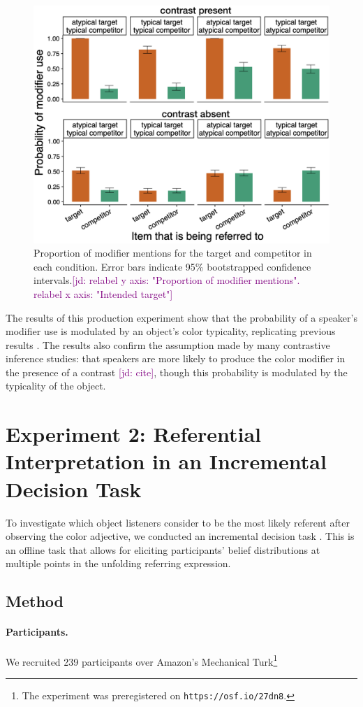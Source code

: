 \documentclass[10pt,letterpaper]{article}
\newcommand{\jd}[1]{\textcolor{Purple}{[jd: #1]}}
\begin{document}
\begin{figure}
	\begin{center}
		\includegraphics[width=.475\textwidth]{graphs/prod-bycond-paper.pdf}
	\end{center}
\caption{Proportion of modifier mentions for the target and competitor in each condition. Error bars indicate 95\% bootstrapped confidence intervals.\jd{relabel y axis: "Proportion of modifier mentions". relabel x axis: "Intended target"}} 
\label{prod-results}
\end{figure}



The results of this production experiment show that the probability of a speaker's modifier use is modulated by an object's color typicality, replicating previous results \cite{Westerbeek2015}. The results also confirm the assumption made by many contrastive inference studies: that speakers are more likely to produce the color modifier in the presence of a contrast \jd{cite}, though this probability is modulated by the typicality of the object.


\section{Experiment 2: Referential Interpretation in an Incremental Decision Task}

To investigate which object listeners consider to be the most likely referent after observing the color adjective, we conducted an incremental decision task \cite{Qing:2018}. This is an offline task that allows for eliciting participants' belief distributions at multiple points in the unfolding referring expression. 

\subsection{Method}
\paragraph{Participants.} We recruited 239 participants over Amazon's Mechanical Turk\footnote{The experiment was preregistered on \texttt{https://osf.io/27dn8}.}%
\end{document}
